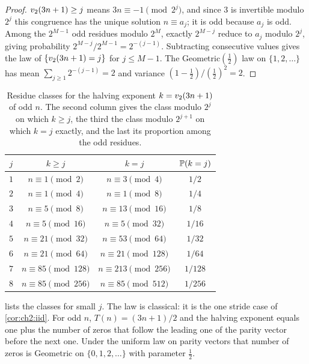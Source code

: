 \begin{proof}
$v_2(3n+1)\geq j$ means $3n\equiv-1\pmod{2^j}$, and since $3$ is invertible
modulo $2^j$ this congruence has the unique solution $n\equiv a_j$; it is odd
because $a_j$ is odd. Among the $2^{M-1}$ odd residues modulo $2^M$, exactly
$2^{M-j}$ reduce to $a_j$ modulo $2^j$, giving probability
$2^{M-j}/2^{M-1}=2^{-(j-1)}$. Subtracting consecutive values gives the law of
$\{v_2(3n+1)=j\}$ for $j\leq M-1$. The Geometric$(\tfrac12)$ law on
$\{1,2,\ldots\}$ has mean $\sum_{j\geq1}2^{-(j-1)}=2$ and variance
$(1-\tfrac12)/(\tfrac12)^2=2$.
\end{proof}

\begin{table}[t]
\centering
\caption{Residue classes for the halving exponent $k=v_2(3n+1)$ of odd $n$.
The second column gives the class modulo $2^j$ on which $k\geq j$, the third the class modulo $2^{j+1}$ on which $k=j$ exactly, and the last its proportion among the odd residues.}
\label{tab:ch2:geom}
\begin{tabular}{@{}cccc@{}}
\toprule
$j$ & $k\geq j$ & $k=j$ & $\mathbb{P}(k=j)$\\
\midrule
$1$ & $n\equiv1\pmod2$ & $n\equiv3\pmod4$ & $1/2$\\
$2$ & $n\equiv1\pmod4$ & $n\equiv1\pmod8$ & $1/4$\\
$3$ & $n\equiv5\pmod8$ & $n\equiv13\pmod{16}$ & $1/8$\\
$4$ & $n\equiv5\pmod{16}$ & $n\equiv5\pmod{32}$ & $1/16$\\
$5$ & $n\equiv21\pmod{32}$ & $n\equiv53\pmod{64}$ & $1/32$\\
$6$ & $n\equiv21\pmod{64}$ & $n\equiv21\pmod{128}$ & $1/64$\\
$7$ & $n\equiv85\pmod{128}$ & $n\equiv213\pmod{256}$ & $1/128$\\
$8$ & $n\equiv85\pmod{256}$ & $n\equiv85\pmod{512}$ & $1/256$\\
\bottomrule
\end{tabular}
\end{table}

 lists the classes for small $j$. The law is classical: it
is the one stride case of \cref{cor:ch2:iid}. For odd $n$, $T(n)=(3n+1)/2$ and the halving
exponent equals one plus the number of zeros that follow the leading one of
the parity vector before the next one. Under the uniform law on parity vectors
that number of zeros is Geometric on $\{0,1,2,\ldots\}$ with parameter
$\tfrac12$.

